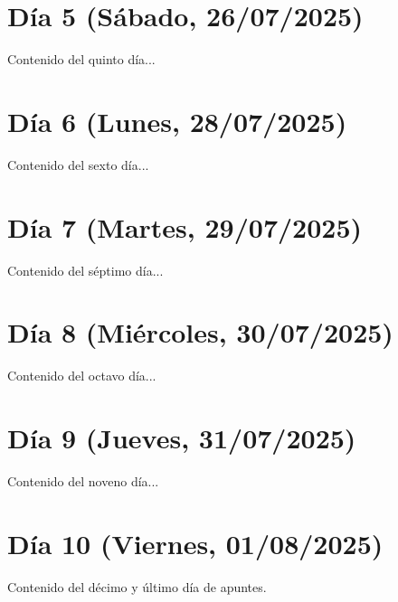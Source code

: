 \documentclass[11pt]{article}
\begin{document}
\newpage
\section{Día 5 (Sábado, 26/07/2025)}
Contenido del quinto día...

\newpage
\section{Día 6 (Lunes, 28/07/2025)}
Contenido del sexto día...

\newpage
\section{Día 7 (Martes, 29/07/2025)}
Contenido del séptimo día...

\newpage
\section{Día 8 (Miércoles, 30/07/2025)}
Contenido del octavo día...

\newpage
\section{Día 9 (Jueves, 31/07/2025)}
Contenido del noveno día...

\newpage
\section{Día 10 (Viernes, 01/08/2025)}
Contenido del décimo y último día de apuntes.
\end{document}
